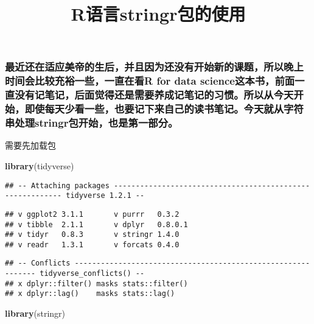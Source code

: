 \documentclass[]{article}
\title{R语言stringr包的使用}
\author{}
\date{}
\newenvironment{Shaded}{\begin{snugshade}}{\end{snugshade}}
\newcommand{\KeywordTok}[1]{\textcolor[rgb]{0.13,0.29,0.53}{\textbf{#1}}}
\newcommand{\NormalTok}[1]{#1}
\begin{document}
\maketitle

\hypertarget{r-for-data-sciencestringr}{%
\subsubsection{\texorpdfstring{最近还在适应美帝的生后，并且因为还没有开始新的课题，所以晚上时间会比较充裕一些，一直在看\textbf{R
for data
science}这本书，前面一直没有记笔记，后面觉得还是需要养成记笔记的习惯。所以从今天开始，即使每天少看一些，也要记下来自己的读书笔记。今天就从字符串处理stringr包开始，也是第一部分。}{最近还在适应美帝的生后，并且因为还没有开始新的课题，所以晚上时间会比较充裕一些，一直在看R for data science这本书，前面一直没有记笔记，后面觉得还是需要养成记笔记的习惯。所以从今天开始，即使每天少看一些，也要记下来自己的读书笔记。今天就从字符串处理stringr包开始，也是第一部分。}}\label{r-for-data-sciencestringr}}

需要先加载包

\begin{Shaded}
\begin{Highlighting}[]
\KeywordTok{library}\NormalTok{(tidyverse)}
\end{Highlighting}
\end{Shaded}

\begin{verbatim}
## -- Attaching packages ---------------------------------------------------------- tidyverse 1.2.1 --
\end{verbatim}

\begin{verbatim}
## v ggplot2 3.1.1       v purrr   0.3.2  
## v tibble  2.1.1       v dplyr   0.8.0.1
## v tidyr   0.8.3       v stringr 1.4.0  
## v readr   1.3.1       v forcats 0.4.0
\end{verbatim}

\begin{verbatim}
## -- Conflicts ------------------------------------------------------------- tidyverse_conflicts() --
## x dplyr::filter() masks stats::filter()
## x dplyr::lag()    masks stats::lag()
\end{verbatim}

\begin{Shaded}
\begin{Highlighting}[]
\KeywordTok{library}\NormalTok{(stringr)}
\end{Highlighting}
\end{Shaded}
\end{document}
